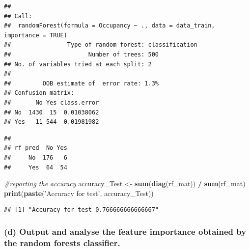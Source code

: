 \documentclass[]{article}
\newenvironment{Shaded}{\begin{snugshade}}{\end{snugshade}}
\newcommand{\CommentTok}[1]{\textcolor[rgb]{0.56,0.35,0.01}{\textit{#1}}}
\newcommand{\KeywordTok}[1]{\textcolor[rgb]{0.13,0.29,0.53}{\textbf{#1}}}
\newcommand{\NormalTok}[1]{#1}
\newcommand{\OperatorTok}[1]{\textcolor[rgb]{0.81,0.36,0.00}{\textbf{#1}}}
\newcommand{\StringTok}[1]{\textcolor[rgb]{0.31,0.60,0.02}{#1}}
\begin{document}
\begin{verbatim}
## 
## Call:
##  randomForest(formula = Occupancy ~ ., data = data_train, importance = TRUE) 
##                Type of random forest: classification
##                      Number of trees: 500
## No. of variables tried at each split: 2
## 
##         OOB estimate of  error rate: 1.3%
## Confusion matrix:
##       No Yes class.error
## No  1430  15  0.01038062
## Yes   11 544  0.01981982
\end{verbatim}

\begin{Shaded}
\end{Shaded}

\begin{verbatim}
##        
## rf_pred  No Yes
##     No  176   6
##     Yes  64  54
\end{verbatim}

\begin{Shaded}
\begin{Highlighting}[]
\CommentTok{#reporting the accuracy}
\NormalTok{accuracy_Test <-}\StringTok{ }\KeywordTok{sum}\NormalTok{(}\KeywordTok{diag}\NormalTok{(rf_mat)) }\OperatorTok{/}\StringTok{ }\KeywordTok{sum}\NormalTok{(rf_mat)}
\KeywordTok{print}\NormalTok{(}\KeywordTok{paste}\NormalTok{(}\StringTok{'Accuracy for test'}\NormalTok{, accuracy_Test))}
\end{Highlighting}
\end{Shaded}

\begin{verbatim}
## [1] "Accuracy for test 0.766666666666667"
\end{verbatim}

\hypertarget{d-output-and-analyse-the-feature-importance-obtained-by-the-random-forests-classifier.}{%
\subsubsection{(d) Output and analyse the feature importance obtained by
the random forests
classifier.}\label{d-output-and-analyse-the-feature-importance-obtained-by-the-random-forests-classifier.}}
\end{document}
